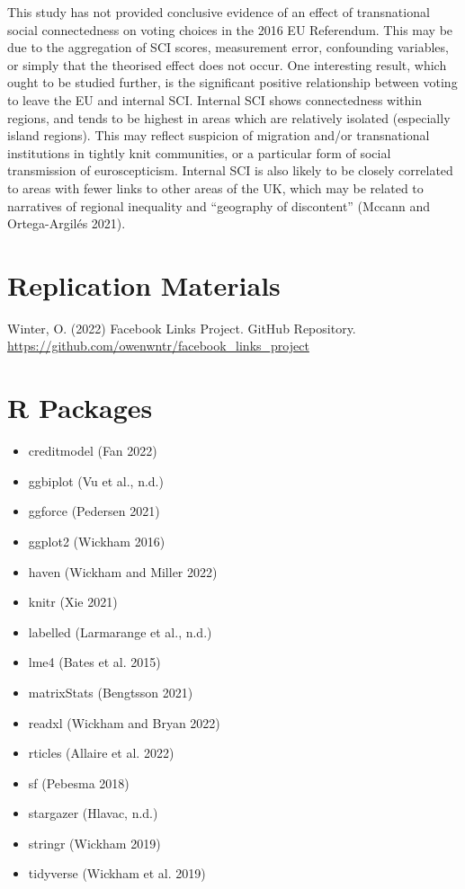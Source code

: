 \documentclass{article}
\providecommand{\tightlist}{%
  \setlength{\itemsep}{0pt}\setlength{\parskip}{0pt}}
\begin{document}
This study has not provided conclusive evidence of an effect of
transnational social connectedness on voting choices in the 2016 EU
Referendum. This may be due to the aggregation of SCI scores,
measurement error, confounding variables, or simply that the theorised
effect does not occur. One interesting result, which ought to be studied
further, is the significant positive relationship between voting to
leave the EU and internal SCI. Internal SCI shows connectedness within
regions, and tends to be highest in areas which are relatively isolated
(especially island regions). This may reflect suspicion of migration
and/or transnational institutions in tightly knit communities, or a
particular form of social transmission of euroscepticism. Internal SCI
is also likely to be closely correlated to areas with fewer links to
other areas of the UK, which may be related to narratives of regional
inequality and ``geography of discontent'' (Mccann and Ortega-Argilés
2021).

\hypertarget{replication-materials}{%
\section*{Replication Materials}\label{replication-materials}}

Winter, O. (2022) Facebook Links Project. GitHub Repository.
\url{https://github.com/owenwntr/facebook_links_project}

\hypertarget{r-packages}{%
\section*{R Packages}\label{r-packages}}

\begin{itemize}
\tightlist
\item
  creditmodel (Fan 2022)
\item
  ggbiplot (Vu et al., n.d.)
\item
  ggforce (Pedersen 2021)
\item
  ggplot2 (Wickham 2016)
\item
  haven (Wickham and Miller 2022)
\item
  knitr (Xie 2021)
\item
  labelled (Larmarange et al., n.d.)
\item
  lme4 (Bates et al. 2015)
\item
  matrixStats (Bengtsson 2021)
\item
  readxl (Wickham and Bryan 2022)
\item
  rticles (Allaire et al. 2022)
\item
  sf (Pebesma 2018)
\item
  stargazer (Hlavac, n.d.)
\item
  stringr (Wickham 2019)
\item
  tidyverse (Wickham et al. 2019)
\end{itemize}
\end{document}
